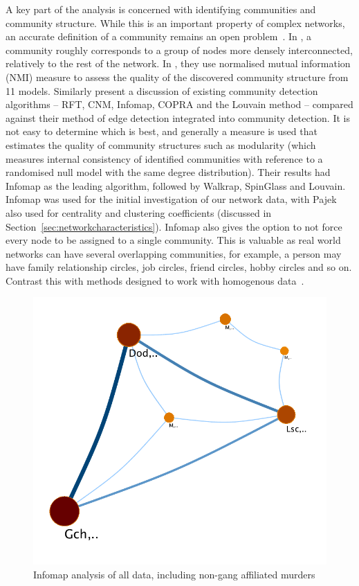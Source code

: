 \documentclass[twocolumn]{svjour3}          %
\theoremstyle{definition}
\begin{document}
A key part of the analysis is concerned with identifying communities
and community structure. While this is an important property of
complex networks, an accurate definition of a community remains an
open problem~\citep{liu-et-al:2014}. In \citet{orman-et-al:2011}, a
community roughly corresponds to a group of nodes more densely
interconnected, relatively to the rest of the network. In
\citet{orman-et-al:2011b}, they use normalised mutual information
(NMI) measure to assess the quality of the discovered community
structure from 11 models. Similarly \citet{yan+gregory:2012} present a
discussion of existing community detection algorithms -- RFT, CNM,
Infomap, COPRA and the Louvain method -- compared against their method
of edge detection integrated into community detection. It is not easy
to determine which is best, and generally a measure is used that
estimates the quality of community structures such as modularity
(which measures internal consistency of identified communities with
reference to a randomised null model with the same degree
distribution). Their results had Infomap as the leading algorithm,
followed by Walkrap, SpinGlass and Louvain. Infomap was used for the
initial investigation of our network data, with Pajek also used for
centrality and clustering coefficients (discussed in
Section~\ref{sec:networkcharacteristics}). Infomap also gives the
option to not force every node to be assigned to a single
community. This is valuable as real world networks can have several
overlapping communities, for example, a person may have family
relationship circles, job circles, friend circles, hobby circles and
so on. Contrast this with methods designed to work with homogenous
data~\citep{ferrara-et-al:2014}.

\begin{figure}[!ht]
\centering
\includegraphics[width=\columnwidth]{images/alldataplusmurderers}
\caption{Infomap analysis of all data, including non-gang affiliated murders}
\label{fig:infomap} 
\end{figure}
\end{document}
